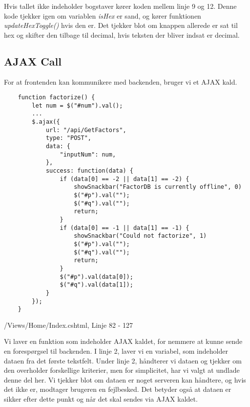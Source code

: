 \documentclass[a4paper,12pt]{extarticle}
\begin{document}
    \medskip

    Hvis tallet ikke indeholder bogstaver kører koden mellem linje 9 og 12.
    Denne kode tjekker igen om variablen \emph{isHex} er sand, og kører funktionen  \emph{updateHexToggle()} hvis den er.
    Det tjekker blot om knappen allerede er sat til hex og skifter den tilbage til decimal, hvis teksten der bliver indsat er decimal.

    \subsection{AJAX Call}
    For at frontenden kan kommunikere med backenden, bruger vi et AJAX kald.


    \begin{listing}[!ht]
        \begin{verbatim}
    function factorize() {
        let num = $("#num").val();
        ...
        $.ajax({
            url: "/api/GetFactors",
            type: "POST",
            data: {
                "inputNum": num,
            },
            success: function(data) {
                if (data[0] == -2 || data[1] == -2) { 
                    showSnackbar("FactorDB is currently offline", 0) 
                    $("#p").val("");
                    $("#q").val("");
                    return;
                }
                if (data[0] == -1 || data[1] == -1) { 
                    showSnackbar("Could not factorize", 1) 
                    $("#p").val("");
                    $("#q").val("");
                    return;
                }
                $("#p").val(data[0]);
                $("#q").val(data[1]);
            }
        });
    }
        \end{verbatim}
        \caption{/Views/Home/Index.cshtml, Linje 82 - 127}
    \end{listing}

    Vi laver en funktion som indeholder AJAX kaldet, for nemmere at kunne sende en forespørgsel til backenden.
    I linje 2, laver vi en variabel, som indeholder dataen fra det første tekstfelt.
    Under linje 2, håndterer vi dataen og tjekker om den overholder forskellige kriterier, men for simplicitet, har vi valgt at undlade denne del her.
    Vi tjekker blot om dataen er noget serveren kan håndtere, og hvis det ikke er, modtager brugeren en fejlbesked.
    Det betyder også at dataen er sikker efter dette punkt og når det skal sendes via AJAX kaldet.
\end{document}
